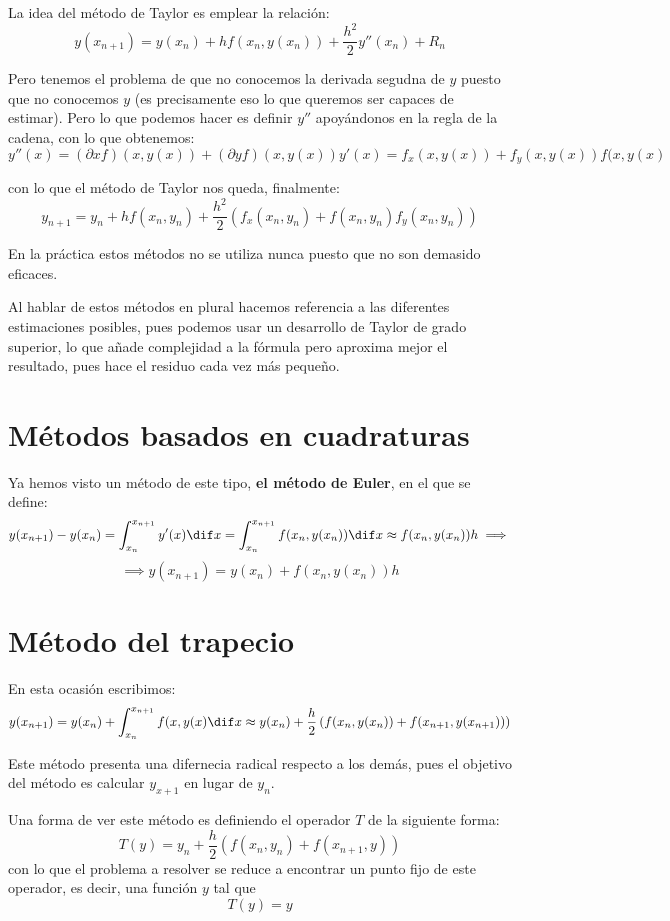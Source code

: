 \documentclass{apuntes}
\begin{document}
La idea del método de Taylor es emplear la relación:
\[y(x_{n+1})=y(x_n)+hf(x_n,y(x_n))+\frac{h^2}{2}y''(x_n)+R_n\]

Pero tenemos el problema de que no conocemos la derivada segudna de $y$ puesto que no conocemos $y$ (es precisamente eso lo que queremos ser capaces de estimar). Pero lo que podemos hacer es definir $y''$ apoyándonos en la regla de la cadena, con lo que obtenemos:
\[y''(x)=(\partial x f)(x,y(x))+(\partial y f)(x,y(x))y'(x)=f_x(x,y(x))+f_y(x,y(x))f(x,y(x)\]

con lo que el método de Taylor nos queda, finalmente:
\[y_{n+1} = y_n + hf(x_n,y_n)+\frac{h^2}{2}\left(f_x(x_n,y_n)+f(x_n, y_n)f_y(x_n,y_n)\right)\]

\begin{remark}
En la práctica estos métodos no se utiliza nunca puesto que no son demasido eficaces.
\end{remark}

Al hablar de estos métodos en plural hacemos referencia a las diferentes estimaciones posibles, pues podemos usar un desarrollo de Taylor de grado superior, lo que añade complejidad a la fórmula pero aproxima mejor el resultado, pues hace el residuo cada vez más pequeño.

\section{Métodos basados en cuadraturas}
Ya hemos visto un método de este tipo, \textbf{el método de Euler}, en el que se define:
\[y(x_{n+1}) -y(x_n) = \int_{x_n}^{x_{n+1}} y'(x)\dif x = \int_{x_n}^{x_{n+1}} f(x_n,y(x_n)) \dif x \approx f(x_n,y(x_n))h \implies \]
\[\implies y(x_{n+1}) =y(x_n)+f(x_n,y(x_n))h\]

\section{Método del trapecio}
En esta ocasión escribimos:
\[y(x_{n+1})=y(x_n) + \int_{x_n}^{x_{n+1}} f(x,y(x)\dif x \approx y(x_n)+ \frac{h}{2}\left( f(x_n,y(x_n))+f(x_{n+1},y(x_{n+1})) \right)\]

Este método presenta una difernecia radical respecto a los demás, pues el objetivo del método es calcular $y_{x+1}$ en lugar de $y_n$.

Una forma de ver este método es definiendo el operador $T$ de la siguiente forma:
\[T(y) = y_n + \frac{h}{2} \left(f(x_n,y_n)+f(x_{n+1}, y) \right)\]
con lo que el problema a resolver se reduce a encontrar un punto fijo de este operador, es decir, una función $y$ tal que
\[T(y)=y\]
\end{document}
